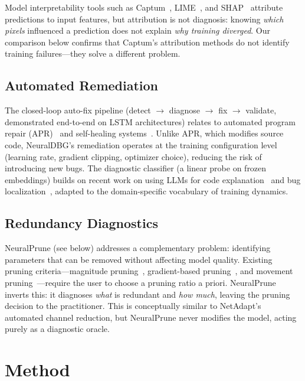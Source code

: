 \documentclass[11pt]{article}
\begin{document}
Model interpretability tools such as Captum~\cite{kokhlikyan2020captum}, LIME~\cite{ribeiro2016lime}, and SHAP~\cite{lundberg2017shap} attribute predictions to input features, but attribution is not diagnosis: knowing \emph{which pixels} influenced a prediction does not explain \emph{why training diverged}. Our comparison below confirms that Captum's attribution methods do not identify training failures---they solve a different problem.

\subsection{Automated Remediation}

The closed-loop auto-fix pipeline (detect $\to$ diagnose $\to$ fix $\to$ validate, demonstrated end-to-end on LSTM architectures) relates to automated program repair (APR)~\cite{legoues2019apr} and self-healing systems~\cite{kephart2003autonomic}. Unlike APR, which modifies source code, NeuralDBG's remediation operates at the training configuration level (learning rate, gradient clipping, optimizer choice), reducing the risk of introducing new bugs. The diagnostic classifier (a linear probe on frozen embeddings) builds on recent work on using LLMs for code explanation~\cite{chen2021codex} and bug localization~\cite{pearce2022codexbugs}, adapted to the domain-specific vocabulary of training dynamics.

\subsection{Redundancy Diagnostics}

NeuralPrune (see below) addresses a complementary problem: identifying parameters that can be removed without affecting model quality. Existing pruning criteria---magnitude pruning~\cite{han2015learning}, gradient-based pruning~\cite{molchanov2017pruning}, and movement pruning~\cite{sanh2020movement}---require the user to choose a pruning ratio a priori. NeuralPrune inverts this: it diagnoses \emph{what} is redundant and \emph{how much}, leaving the pruning decision to the practitioner. This is conceptually similar to NetAdapt's~\cite{yang2018netadapt} automated channel reduction, but NeuralPrune never modifies the model, acting purely as a diagnostic oracle.

\section{Method}
\end{document}
